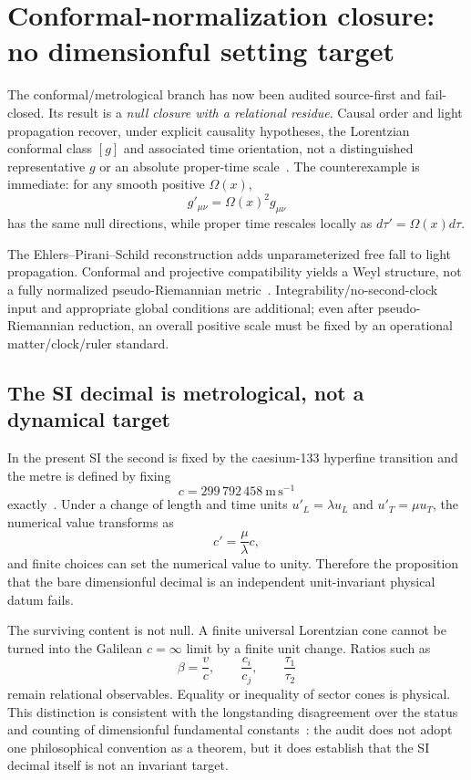 \documentclass[11pt,a4paper]{article}
\begin{document}
\section{Conformal-normalization closure: no dimensionful setting target}
\label{sec:conformal-closure}
The conformal/metrological branch has now been audited source-first and fail-closed. Its result is a \emph{null closure with a relational residue}. Causal order and light propagation recover, under explicit causality hypotheses, the Lorentzian conformal class $[g]$ and associated time orientation, not a distinguished representative $g$ or an absolute proper-time scale~\cite{hkm1976,malament1977}. The counterexample is immediate: for any smooth positive $\Omega(x)$,
\begin{equation}
 g'_{\mu\nu}=\Omega(x)^2g_{\mu\nu}
\end{equation}
has the same null directions, while proper time rescales locally as $d\tau'=\Omega(x)d\tau$.

The Ehlers--Pirani--Schild reconstruction adds unparameterized free fall to light propagation. Conformal and projective compatibility yields a Weyl structure, not a fully normalized pseudo-Riemannian metric~\cite{eps1972,eps2012}. Integrability/no-second-clock input and appropriate global conditions are additional; even after pseudo-Riemannian reduction, an overall positive scale must be fixed by an operational matter/clock/ruler standard.

\subsection{The SI decimal is metrological, not a dynamical target}
In the present SI the second is fixed by the caesium-133 hyperfine transition and the metre is defined by fixing
\begin{equation}
 c=299\,792\,458\ \mathrm{m\,s^{-1}}
\end{equation}
exactly~\cite{bipm_metre,bipm_constants}. Under a change of length and time units $u'_L=\lambda u_L$ and $u'_T=\mu u_T$, the numerical value transforms as
\begin{equation}
 c'=\frac{\mu}{\lambda}c,
\end{equation}
and finite choices can set the numerical value to unity. Therefore the proposition that the bare dimensionful decimal is an independent unit-invariant physical datum fails.

The surviving content is not null. A finite universal Lorentzian cone cannot be turned into the Galilean $c=\infty$ limit by a finite unit change. Ratios such as
\begin{equation}
 \beta=\frac vc,\qquad \frac{c_i}{c_j},\qquad \frac{\tau_1}{\tau_2}
\end{equation}
remain relational observables. Equality or inequality of sector cones is physical. This distinction is consistent with the longstanding disagreement over the status and counting of dimensionful fundamental constants~\cite{duff2002,matsas2007,matsas2023}: the audit does not adopt one philosophical convention as a theorem, but it does establish that the SI decimal itself is not an invariant target.
\end{document}
